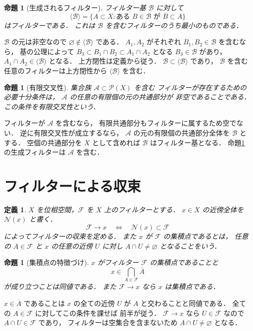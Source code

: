 \documentclass[a5paper,10pt,onecolumn]{jsarticle}
\makeatletter
\theoremstyle{mathnotetheorem}
\newtheorem{definition}[theorem]{定義}
\newtheorem{proposition}[theorem]{命題}
\renewcommand{\proofname}{証明}
\renewenvironment{proof}[1][\proofname]{%
  \par\pushQED{\qed}\normalfont\topsep4\p@\@plus2\p@\relax
  \trivlist\item[\hskip\labelsep\bfseries #1]\ignorespaces
}{\popQED\endtrivlist\@endpefalse}
\makeatother
\begin{document}
\begin{proposition}[生成されるフィルター]\label{prop:generated}
フィルター基 $\mathcal B$ に対して
\[
 \langle\mathcal B\rangle
 =\{A\subset X:\text{ある }B\in\mathcal B\text{ が }B\subset A\}
\]
はフィルターである．
これは $\mathcal B$ を含むフィルターのうち最小のものである．
\end{proposition}
\begin{proof}
$\mathcal B$ の元は非空なので
$\varnothing\notin\langle\mathcal B\rangle$ である．
$A_1,A_2$ がそれぞれ $B_1,B_2\in\mathcal B$ を含むなら，
基の公理によって
$B_3\subset B_1\cap B_2\subset A_1\cap A_2$
となる $B_3\in\mathcal B$ があり，
$A_1\cap A_2\in\langle\mathcal B\rangle$ となる．
上方閉性は定義から従う．
$\mathcal B\subset\langle\mathcal B\rangle$ であり，
$\mathcal B$ を含む任意のフィルターは上方閉性から
$\langle\mathcal B\rangle$ を含む．
\end{proof}

\begin{proposition}[有限交叉性]\label{prop:fip}
集合族 $\mathcal A\subset\mathcal P(X)$ を含む
フィルターが存在するための必要十分条件は，
$\mathcal A$ の任意の有限個の元の共通部分が
非空であることである．
この条件を\emph{有限交叉性}という．
\end{proposition}
\begin{proof}
フィルターが $\mathcal A$ を含むなら，
有限共通部分もフィルターに属するため空でない．
逆に有限交叉性が成立するなら，
$\mathcal A$ の元の有限個の共通部分全体を
$\mathcal B$ とする．
空個の共通部分を $X$ として含めれば
$\mathcal B$ はフィルター基となる．
命題\ref{prop:generated}の生成フィルターは
$\mathcal A$ を含む．
\end{proof}

\section{フィルターによる収束}

\begin{definition}
$X$ を位相空間，$\mathcal F$ を $X$ 上のフィルターとする．
$x\in X$ の近傍全体を $\mathcal N(x)$ と書く．
\[
 \mathcal F\longrightarrow x
 \quad\Longleftrightarrow\quad
 \mathcal N(x)\subset\mathcal F
\]
によってフィルターの\emph{収束}を定める．
また $x$ が $\mathcal F$ の\emph{集積点}であるとは，
任意の $A\in\mathcal F$ と $x$ の任意の近傍 $U$ に対し
$A\cap U\ne\varnothing$ となることをいう．
\end{definition}

\begin{proposition}[集積点の特徴づけ]\label{prop:cluster}
$x$ がフィルター $\mathcal F$ の集積点であることと
\[
 x\in\bigcap_{A\in\mathcal F}\overline A
\]
が成り立つことは同値である．
また $\mathcal F\to x$ なら $x$ は集積点である．
\end{proposition}
\begin{proof}
$x\in\overline A$ であることは
$x$ の全ての近傍 $U$ が $A$ と交わることと同値である．
全ての $A\in\mathcal F$ に対してこの条件を課せば
前半が従う．
$\mathcal F\to x$ なら $U\in\mathcal F$ なので
$A\cap U\in\mathcal F$ であり，
フィルターは空集合を含まないため
$A\cap U\ne\varnothing$ となる．
\end{proof}
\end{document}
